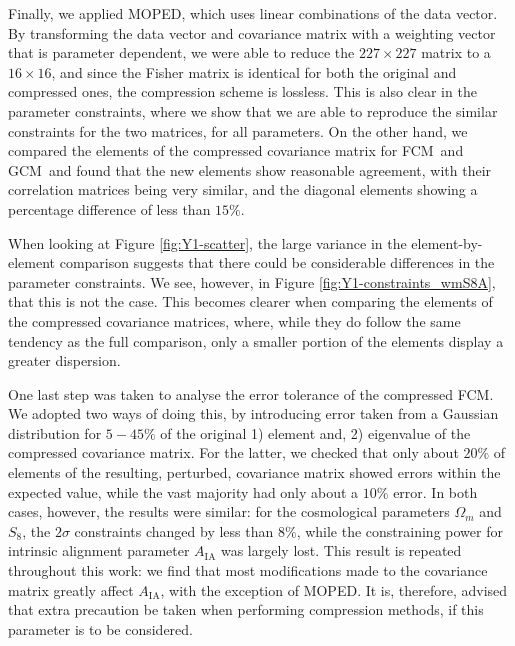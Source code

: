 \documentclass[twocolumn]{\docclass}
\newcommand{\rf}[1]{Figure \ref{fig:#1}}
\newcommand\full{FCM}
\newcommand\gaussian{GCM}
\begin{document}
	Finally, we applied MOPED, which uses linear combinations of the data vector. By transforming the data vector and covariance matrix with a weighting vector that is parameter dependent, we were able to reduce the $227 \times 227$ matrix to a $16 \times 16$, and since the Fisher matrix is identical for both the original and compressed ones, the compression scheme is lossless. This is also clear in the parameter constraints, where we show that we are able to reproduce the similar constraints for the two matrices, for all parameters. On the other hand, we compared the elements of the compressed covariance matrix for \full\ and \gaussian\ and found that the new elements show reasonable agreement, with their correlation matrices being very similar, and the diagonal elements showing a percentage difference of less than $15\%$.
	
	When looking at \rf{Y1-scatter}, the large variance in the element-by-element comparison suggests that there could be considerable differences in the parameter constraints. We see, however, in \rf{Y1-constraints_wmS8A}, that this is not the case. This becomes clearer when comparing the elements of the compressed covariance matrices, where, while they do follow the same tendency as the full comparison, only a smaller portion of the elements display a greater dispersion.
	
	One last step was taken to analyse the error tolerance of the compressed \full. We adopted two ways of doing this, by introducing error taken from a Gaussian distribution for $5 - 45 \%$ of the original 1) element and, 2) eigenvalue of the compressed covariance matrix. For the latter, we checked that only about $20 \%$ of elements of the resulting, perturbed, covariance matrix showed errors within the expected value, while the vast majority had only about a $10\%$ error. In both cases, however, the results were similar: for the cosmological parameters $\Omega_m$ and $S_8$, the $2\sigma$ constraints changed by less than $8\%$, while the constraining power for intrinsic alignment parameter $A_{\mathrm{IA}}$ was largely lost. This result is repeated throughout this work: we find that most modifications made to the covariance matrix greatly affect $A_{\mathrm{IA}}$, with the exception of MOPED. It is, therefore, advised that extra precaution be taken when performing compression methods, if this parameter is to be considered.
	
\end{document}

